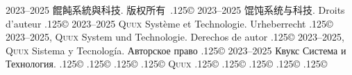 \documentclass{cookbook}
\begin{document}
{{{	2023--2025 餛飩系統與科技.
版权所有~{\lower.125\baselineskip\hbox{\copyright}}
	2023--2025 馄饨系统与科技.
Droits d'auteur {\lower.125\baselineskip\hbox{\copyright}} %
	2023--2025 \textsc{Quux} Système et Technologie.
Urheberrecht {\lower.125\baselineskip\hbox{\copyright}} %
	2023--2025, \textsc{Quux} System und Technologie.
Derechos de autor {\lower.125\baselineskip\hbox{\copyright}} %
	2023--2025, \textsc{Quux} Sistema y Tecnología.
\foreignlanguage{russian}{Авторское право} %
	{\lower.125\baselineskip\hbox{\copyright}}
	2023–2025 \foreignlanguage{russian}{Квукс Система и Технология.}
{\lower.125\baselineskip\hbox{\copyright}}
{\lower.125\baselineskip\hbox{\copyright}}
{\lower.125\baselineskip\hbox{\copyright}}
{\lower.125\baselineskip\hbox{\copyright}}
\textsc{Quux}
{\lower.125\baselineskip\hbox{\copyright}}
{\lower.125\baselineskip\hbox{\copyright}}
{\lower.125\baselineskip\hbox{\copyright}}
{\lower.125\baselineskip\hbox{\copyright}}
{\lower.125\baselineskip\hbox{\copyright}}
\vspace{-.5\textheight}%
}}}%
\end{document}
